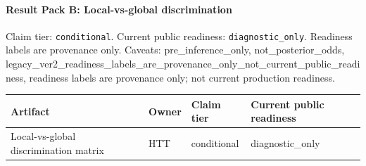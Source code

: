 \paragraph{Result Pack B: Local-vs-global discrimination}
Claim tier: \texttt{conditional}. Current public readiness:
\texttt{diagnostic\_only}. Readiness labels are
provenance only. Caveats: pre\_inference\_only, not\_posterior\_odds, legacy\_ver2\_readiness\_labels\_are\_provenance\_only\_not\_current\_public\_readiness, readiness labels are provenance only; not current production readiness.

\begin{center}
\begin{tabular}{llll}
\hline
Artifact & Owner & Claim tier & Current public readiness \\
\hline
Local-vs-global discrimination matrix & HTT & conditional & diagnostic\_only \\
\hline
\end{tabular}
\end{center}
